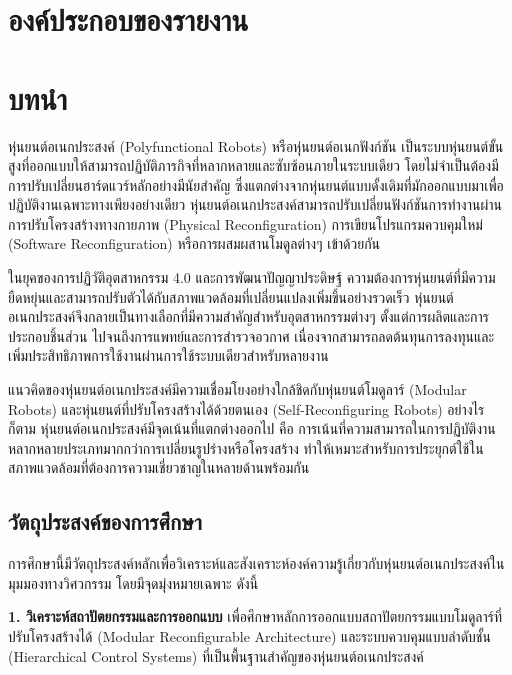 \documentclass[a4paper]{article}
\begin{document}
\newpage

\section*{องค์ประกอบของรายงาน}

\newpage

\section{บทนำ}
หุ่นยนต์อเนกประสงค์ (Polyfunctional Robots) หรือหุ่นยนต์อเนกฟังก์ชัน เป็นระบบหุ่นยนต์ขั้นสูงที่ออกแบบให้สามารถปฏิบัติภารกิจที่หลากหลายและซับซ้อนภายในระบบเดียว โดยไม่จำเป็นต้องมีการปรับเปลี่ยนฮาร์ดแวร์หลักอย่างมีนัยสำคัญ \parencite{liang2025decoding} ซึ่งแตกต่างจากหุ่นยนต์แบบดั้งเดิมที่มักออกแบบมาเพื่อปฏิบัติงานเฉพาะทางเพียงอย่างเดียว หุ่นยนต์อเนกประสงค์สามารถปรับเปลี่ยนฟังก์ชันการทำงานผ่านการปรับโครงสร้างทางกายภาพ (Physical Reconfiguration) การเขียนโปรแกรมควบคุมใหม่ (Software Reconfiguration) หรือการผสมผสานโมดูลต่างๆ เข้าด้วยกัน \parencite{post2023modular}

ในยุคของการปฏิวัติอุตสาหกรรม 4.0 และการพัฒนาปัญญาประดิษฐ์ ความต้องการหุ่นยนต์ที่มีความยืดหยุ่นและสามารถปรับตัวได้กับสภาพแวดล้อมที่เปลี่ยนแปลงเพิ่มขึ้นอย่างรวดเร็ว \parencite{mohammadi2023mobile} หุ่นยนต์อเนกประสงค์จึงกลายเป็นทางเลือกที่มีความสำคัญสำหรับอุตสาหกรรมต่างๆ ตั้งแต่การผลิตและการประกอบชิ้นส่วน ไปจนถึงการแพทย์และการสำรวจอวกาศ เนื่องจากสามารถลดต้นทุนการลงทุนและเพิ่มประสิทธิภาพการใช้งานผ่านการใช้ระบบเดียวสำหรับหลายงาน

แนวคิดของหุ่นยนต์อเนกประสงค์มีความเชื่อมโยงอย่างใกล้ชิดกับหุ่นยนต์โมดูลาร์ (Modular Robots) และหุ่นยนต์ที่ปรับโครงสร้างได้ด้วยตนเอง (Self-Reconfiguring Robots) \parencite{seo2019modular} อย่างไรก็ตาม หุ่นยนต์อเนกประสงค์มีจุดเน้นที่แตกต่างออกไป คือ การเน้นที่ความสามารถในการปฏิบัติงานหลากหลายประเภทมากกว่าการเปลี่ยนรูปร่างหรือโครงสร้าง ทำให้เหมาะสำหรับการประยุกต์ใช้ในสภาพแวดล้อมที่ต้องการความเชี่ยวชาญในหลายด้านพร้อมกัน

\subsection{วัตถุประสงค์ของการศึกษา}

การศึกษานี้มีวัตถุประสงค์หลักเพื่อวิเคราะห์และสังเคราะห์องค์ความรู้เกี่ยวกับหุ่นยนต์อเนกประสงค์ในมุมมองทางวิศวกรรม โดยมีจุดมุ่งหมายเฉพาะ ดังนี้

\textbf{1. วิเคราะห์สถาปัตยกรรมและการออกแบบ} เพื่อศึกษาหลักการออกแบบสถาปัตยกรรมแบบโมดูลาร์ที่ปรับโครงสร้างได้ (Modular Reconfigurable Architecture) และระบบควบคุมแบบลำดับชั้น (Hierarchical Control Systems) ที่เป็นพื้นฐานสำคัญของหุ่นยนต์อเนกประสงค์ \parencite{tassi2024multimodal}
\end{document}
